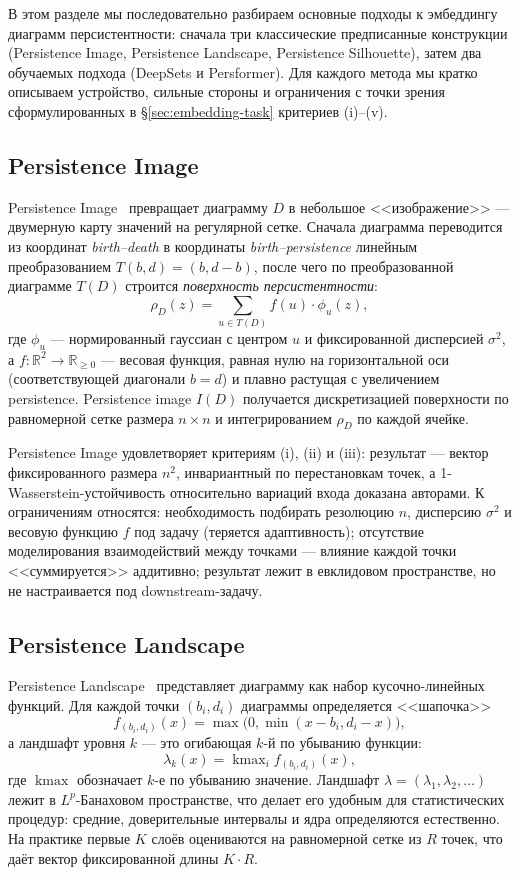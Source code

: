 В этом разделе мы последовательно разбираем основные подходы к эмбеддингу диаграмм персистентности: сначала три классические предписанные конструкции (Persistence Image, Persistence Landscape, Persistence Silhouette), затем два обучаемых подхода (DeepSets и Persformer). Для каждого метода мы кратко описываем устройство, сильные стороны и ограничения с точки зрения сформулированных в §\ref{sec:embedding-task} критериев (i)--(v).

\subsection{Persistence Image}
\label{ssec:pi}

Persistence Image~\cite{adamsPersistenceImages2017} превращает диаграмму $D$ в небольшое <<изображение>> --- двумерную карту значений на регулярной сетке. Сначала диаграмма переводится из координат \emph{birth--death} в координаты \emph{birth--persistence} линейным преобразованием $T(b, d) = (b, d - b)$, после чего по преобразованной диаграмме $T(D)$ строится \emph{поверхность персистентности}:
\[
\rho_D(z) = \sum_{u \in T(D)} f(u) \cdot \phi_u(z),
\]
где $\phi_u$ --- нормированный гауссиан с центром $u$ и фиксированной дисперсией $\sigma^2$, а $f \colon \mathbb{R}^2 \to \mathbb{R}_{\ge 0}$ --- весовая функция, равная нулю на горизонтальной оси (соответствующей диагонали $b = d$) и плавно растущая с увеличением persistence. Persistence image $I(D)$ получается дискретизацией поверхности по равномерной сетке размера $n \times n$ и интегрированием $\rho_D$ по каждой ячейке.

Persistence Image удовлетворяет критериям (i), (ii) и (iii): результат --- вектор фиксированного размера $n^2$, инвариантный по перестановкам точек, а 1-Wasserstein-устойчивость относительно вариаций входа доказана авторами. К ограничениям относятся: необходимость подбирать резолюцию $n$, дисперсию $\sigma^2$ и весовую функцию $f$ под задачу (теряется адаптивность); отсутствие моделирования взаимодействий между точками --- влияние каждой точки <<суммируется>> аддитивно; результат лежит в евклидовом пространстве, но не настраивается под downstream-задачу.

\subsection{Persistence Landscape}
\label{ssec:pl}

Persistence Landscape~\cite{bubenikStatisticalTopologicalData2015} представляет диаграмму как набор кусочно-линейных функций. Для каждой точки $(b_i, d_i)$ диаграммы определяется <<шапочка>>
\[
f_{(b_i, d_i)}(x) = \max\bigl(0, \min(x - b_i, d_i - x)\bigr),
\]
а ландшафт уровня $k$ --- это огибающая $k$-й по убыванию функции:
\[
\lambda_k(x) = \mathop{\mathrm{kmax}}_{i} f_{(b_i, d_i)}(x),
\]
где $\mathop{\mathrm{kmax}}$ обозначает $k$-е по убыванию значение. Ландшафт $\lambda = (\lambda_1, \lambda_2, \dots)$ лежит в $L^p$-Банаховом пространстве, что делает его удобным для статистических процедур: средние, доверительные интервалы и ядра определяются естественно. На практике первые $K$ слоёв оцениваются на равномерной сетке из $R$ точек, что даёт вектор фиксированной длины $K \cdot R$.

